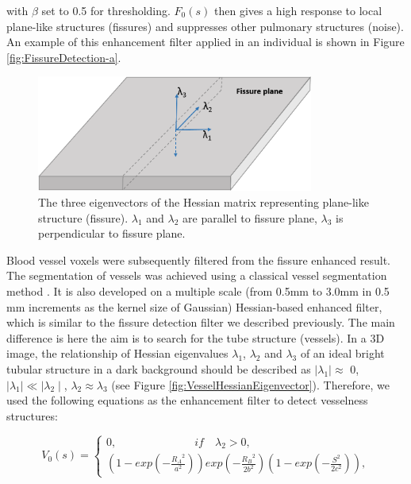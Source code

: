 {\noindent with $\beta$ set to 0.5 for thresholding. $F_0(s)$ then gives a high response to local plane-like structures (fissures) and suppresses other pulmonary structures (noise). An example of this enhancement filter applied in an individual is shown in Figure \ref{fig:FissureDetection-a}. 

\begin{figure}[htbp]
  \centering 
	\vspace{.15in} %
  \includegraphics[height=1.5in]{Segmentation/Image/FissureHessianEigenvector.png}
  \caption{The three eigenvectors of the Hessian matrix representing plane-like structure (fissure). $\lambda_1$ and $\lambda_2$ are parallel to fissure plane, $\lambda_3$ is perpendicular to fissure plane.}
  \label{fig:FissureHessianEigenvector}
\end{figure}

Blood vessel voxels were subsequently filtered from the fissure enhanced result. The segmentation of vessels was achieved using a classical vessel segmentation method \citep{frangi1998multiscale}. It is also developed on a multiple scale (from 0.5mm to 3.0mm in 0.5 mm increments as the kernel size of Gaussian) Hessian-based enhanced filter, which is similar to the fissure detection filter we described previously. The main difference is here the aim is to search for the tube structure (vessels). In a 3D image,  the relationship of Hessian eigenvalues $\lambda_{1}$, $\lambda_{2}$ and $\lambda_{3}$ of an ideal bright tubular structure in a dark background should be described as $\mid\lambda_{1}\mid\approx$ 0, $\mid\lambda_{1}\mid\ll\mid\lambda_{2}\mid$,  $\lambda_{2}\approx\lambda_{3}$ (see Figure \ref{fig:VesselHessianEigenvector}). Therefore, we used the following equations as the enhancement filter to detect vesselness structures:

\begin{equation}
\label{eq:VesselHessian1}
V_0(s) = \begin{cases}
         0,\quad\quad\quad\quad\quad\quad\quad if \quad \lambda_{2}>0,\\
         (1-exp(-\frac{{R_A}^2}{a^2}))exp(-\frac{{R_B}^2}{2b^2})(1-exp(-\frac{S^2}{2c^2})),
         \end{cases}
\end{equation}

}
